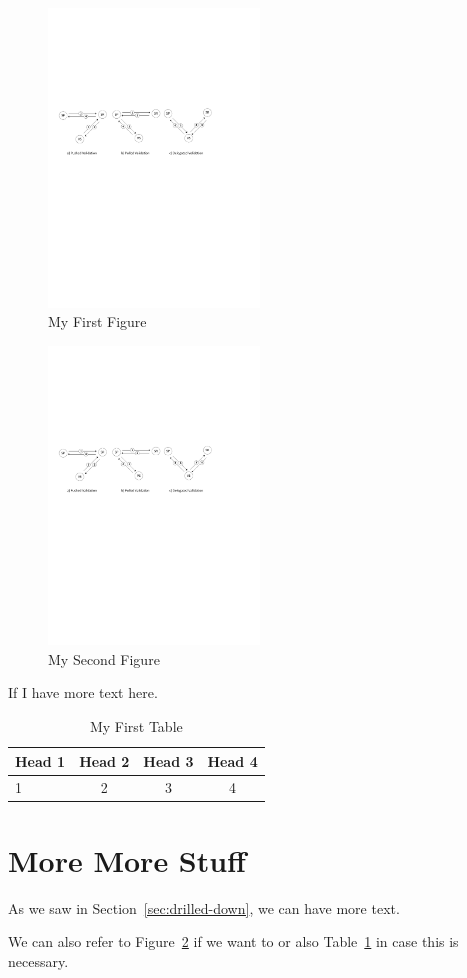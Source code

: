 \documentclass{article}
\begin{document}
\begin{figure}
\centering
\includegraphics[width=0.5\textwidth]{att-models-base}
\caption{My First Figure}\label{fig:first-figure}
\end{figure}

\begin{figure}
\centering
\includegraphics[width=0.5\textwidth]{att-models-base}
\caption{My Second Figure}\label{fig:second-figure}
\end{figure}

If I have more text here.

\begin{table}
\centering
\begin{tabular}{|l|c|c|c|}\hline
Head 1	&	Head 2	&	Head 3	&	Head 4	\\	\hline
1		&	2		&	3		&	4		\\

\hline
\end{tabular}
\caption{My First Table}\label{tab:first-table}
\end{table}

\section{More More Stuff}
As we saw in Section~\ref{sec:drilled-down}, we can have more text.

We can also refer to Figure~\ref{fig:second-figure} if we want to or also
Table~\ref{tab:first-table} in case this is necessary.


\end{document}
